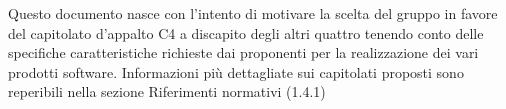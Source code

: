 Questo documento nasce con l'intento di motivare la scelta del gruppo in favore del capitolato d'appalto C4 a discapito degli altri quattro tenendo conto delle specifiche caratteristiche richieste dai proponenti per la realizzazione dei vari prodotti software. Informazioni più dettagliate sui capitolati proposti sono reperibili nella sezione Riferimenti normativi (1.4.1)

